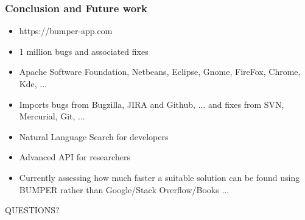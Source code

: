 \documentclass{beamer}
\begin{document}
\begin{frame}
\frametitle{Conclusion and Future work}

\begin{itemize}
\item https://bumper-app.com
\item 1 million bugs and associated fixes
\item Apache Software Foundation, Netbeans, Eclipse, Gnome, FireFox, Chrome, Kde, ...
\item Imports bugs from Bugzilla, JIRA and Github, ... and fixes from SVN, Mercurial, Git, ...
\item Natural Language Search for developers
\item Advanced API for researchers
\vspace{0.5cm}
\item Currently assessing how much faster a suitable solution can be found using BUMPER rather than Google/Stack Overflow/Books ...
\end{itemize}



\end{frame}




\begin{frame}
\Huge{\centerline{QUESTIONS?}}
\end{frame}

\end{document}
